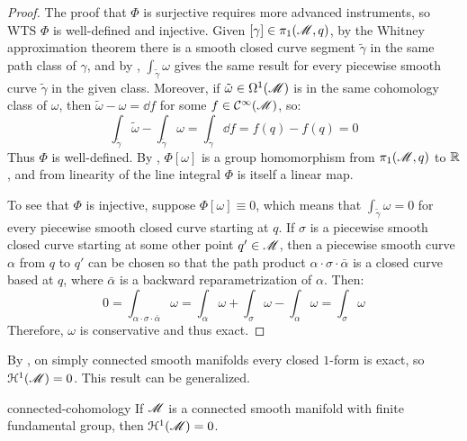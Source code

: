 \begin{proofbox}
  \begin{proof}
    The proof that $ \Phi $ is surjective requires more advanced instruments, so WTS $ \Phi $ is well-defined and injective. Given $ [\gamma] \in \pi_1(\mathscr{M},q) $, by the Whitney approximation theorem  there is a smooth closed curve segment $ \tilde{\gamma} $ in the same path class of $ \gamma $, and by , $ \int_{\tilde{\gamma}} \omega $ gives the same result for every piecewise smooth curve $ \tilde{\gamma} $ in the given class. Moreover, if $ \tilde{\omega} \in \Omega^{1}(\mathscr{M}) $ is in the same cohomology class of $ \omega $, then $ \tilde{\omega} - \omega = \dd f $ for some $ f \in \mathcal{C}^{\infty}(\mathscr{M}) $, so:
    \begin{equation*}
      \int_{\tilde{\gamma}} \tilde{\omega} - \int_{\tilde{\gamma}} \omega = \int_{\tilde{\gamma}} \dd f = f(q) - f(q) = 0
    \end{equation*}
    Thus $ \Phi $ is well-defined. By , $ \Phi[\omega] $ is a group homomorphism from $ \pi_1(\mathscr{M},q) $ to $ \mathbb{R} $, and from linearity of the line integral $ \Phi $ is itself a linear map.

    To see that $ \Phi $ is injective, suppose $ \Phi[\omega] \equiv 0 $, which means that $ \int_{\tilde{\gamma}} \omega = 0 $ for every piecewise smooth closed curve starting at $ q $. If $ \sigma $ is a piecewise smooth closed curve starting at some other point $ q' \in \mathscr{M} $, then a piecewise smooth curve $ \alpha $ from $ q $ to $ q' $ can be chosen so that the path product $ \alpha \cdot \sigma \cdot \bar{\alpha} $ is a closed curve based at $ q $, where $ \bar{\alpha} $ is a backward reparametrization of $ \alpha $. Then:
    \begin{equation*}
      0 = \int_{\alpha \cdot \sigma \cdot \bar{\alpha}} \omega = \int_\alpha \omega + \int_\sigma \omega - \int_\alpha \omega = \int_\sigma \omega
    \end{equation*}
    Therefore, $ \omega $ is conservative and thus exact.
  \end{proof}
\end{proofbox}

By , on simply connected smooth manifolds every closed $ 1 $-form is exact, so $ \EuScript{H}^{1}(\mathscr{M}) = 0 $. This result can be generalized.

\begin{corollary}{}{connected-cohomology}
  If $ \mathscr{M} $ is a connected smooth manifold with finite fundamental group, then $ \EuScript{H}^{1}(\mathscr{M}) = 0 $.
\end{corollary}

